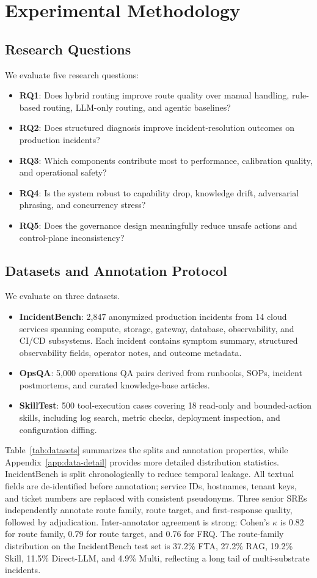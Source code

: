 \documentclass[conference]{IEEEtran}
\begin{document}
\section{Experimental Methodology}
\subsection{Research Questions}
We evaluate five research questions:
\begin{itemize}
    \item \textbf{RQ1}: Does hybrid routing improve route quality over manual handling, rule-based routing, LLM-only routing, and agentic baselines?
    \item \textbf{RQ2}: Does structured diagnosis improve incident-resolution outcomes on production incidents?
    \item \textbf{RQ3}: Which components contribute most to performance, calibration quality, and operational safety?
    \item \textbf{RQ4}: Is the system robust to capability drop, knowledge drift, adversarial phrasing, and concurrency stress?
    \item \textbf{RQ5}: Does the governance design meaningfully reduce unsafe actions and control-plane inconsistency?
\end{itemize}

\subsection{Datasets and Annotation Protocol}
We evaluate on three datasets.
\begin{itemize}
    \item \textbf{IncidentBench}: 2{,}847 anonymized production incidents from 14 cloud services spanning compute, storage, gateway, database, observability, and CI/CD subsystems. Each incident contains symptom summary, structured observability fields, operator notes, and outcome metadata.
    \item \textbf{OpsQA}: 5{,}000 operations QA pairs derived from runbooks, SOPs, incident postmortems, and curated knowledge-base articles.
    \item \textbf{SkillTest}: 500 tool-execution cases covering 18 read-only and bounded-action skills, including log search, metric checks, deployment inspection, and configuration diffing.
\end{itemize}

Table~\ref{tab:datasets} summarizes the splits and annotation properties, while Appendix~\ref{app:data-detail} provides more detailed distribution statistics. IncidentBench is split chronologically to reduce temporal leakage. All textual fields are de-identified before annotation; service IDs, hostnames, tenant keys, and ticket numbers are replaced with consistent pseudonyms. Three senior SREs independently annotate route family, route target, and first-response quality, followed by adjudication. Inter-annotator agreement is strong: Cohen's $\kappa$ is 0.82 for route family, 0.79 for route target, and 0.76 for FRQ. The route-family distribution on the IncidentBench test set is 37.2\% FTA, 27.2\% RAG, 19.2\% Skill, 11.5\% Direct-LLM, and 4.9\% Multi, reflecting a long tail of multi-substrate incidents.
\end{document}
